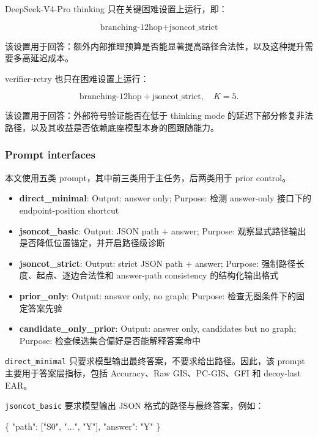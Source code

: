\documentclass[
  11pt,
]{article}
\newenvironment{Shaded}{}{}
\newcommand{\DataTypeTok}[1]{\textcolor[rgb]{0.56,0.13,0.00}{#1}}
\newcommand{\FunctionTok}[1]{\textcolor[rgb]{0.02,0.16,0.49}{#1}}
\newcommand{\OtherTok}[1]{\textcolor[rgb]{0.00,0.44,0.13}{#1}}
\newcommand{\StringTok}[1]{\textcolor[rgb]{0.25,0.44,0.63}{#1}}
\providecommand{\tightlist}{%
  \setlength{\itemsep}{0pt}\setlength{\parskip}{0pt}}
\begin{document}
DeepSeek-V4-Pro thinking 只在关键困难设置上运行，即：

\[\text{branching-12hop} + \text{jsoncot\_strict}\]

该设置用于回答：额外内部推理预算是否能显著提高路径合法性，以及这种提升需要多高延迟成本。

verifier-retry 也只在困难设置上运行：

\[
\text{branching-12hop} + \text{jsoncot\_strict},\quad K=5.  
\]

该设置用于回答：外部符号验证能否在低于 thinking mode
的延迟下部分修复非法路径，以及其收益是否依赖底座模型本身的图跟随能力。

\subsubsection{Prompt interfaces}\label{prompt-interfaces}

本文使用五类 prompt，其中前三类用于主任务，后两类用于 prior control。

\begin{itemize}
\tightlist
\item
  \textbf{direct\_minimal}: Output: answer only; Purpose: 检测
  answer-only 接口下的 endpoint-position shortcut
\item
  \textbf{jsoncot\_basic}: Output: JSON path + answer; Purpose:
  观察显式路径输出是否降低位置锚定，并开启路径级诊断
\item
  \textbf{jsoncot\_strict}: Output: strict JSON path + answer; Purpose:
  强制路径长度、起点、逐边合法性和 answer-path consistency
  的结构化输出格式
\item
  \textbf{prior\_only}: Output: answer only, no graph; Purpose:
  检查无图条件下的固定答案先验
\item
  \textbf{candidate\_only\_prior}: Output: answer only, candidates but
  no graph; Purpose: 检查候选集合偏好是否能解释答案命中
\end{itemize}

\texttt{direct\_minimal}
只要求模型输出最终答案，不要求给出路径。因此，该 prompt
主要用于答案层指标，包括 Accuracy、Raw GIS、PC-GIS、GFI 和 decoy-last
EAR。

\texttt{jsoncot\_basic} 要求模型输出 JSON 格式的路径与最终答案，例如：

\begin{Shaded}
\begin{Highlighting}[]
\FunctionTok{\{}
  \DataTypeTok{"path"}\FunctionTok{:} \OtherTok{[}\StringTok{"S0"}\OtherTok{,} \StringTok{"..."}\OtherTok{,} \StringTok{"Y"}\OtherTok{]}\FunctionTok{,}
  \DataTypeTok{"answer"}\FunctionTok{:} \StringTok{"Y"}
\FunctionTok{\}}
\end{Highlighting}
\end{Shaded}
\end{document}
